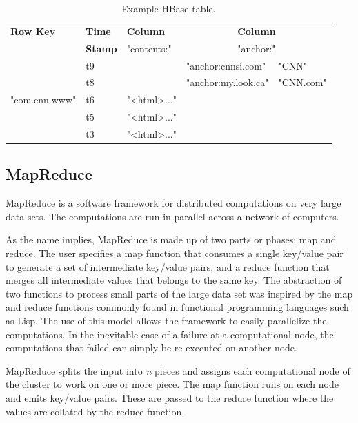 \begin{table}[h]
    \begin{center}
        \begin{tabular}{|l|l|l|l|l|}
        \hline
        \small \bf Row Key & \small \bf Time & \small \bf Column &
        \multicolumn{2}{|c|}{\small \bf Column} \\
         & \small \bf Stamp & \small "contents:" &
        \multicolumn{2}{|c|}{\small "anchor:"} \\
        \hline
         & t9 & & \small "anchor:cnnsi.com" & "CNN" \\
         & t8 & & \small "anchor:my.look.ca" & "CNN.com" \\
        "com.cnn.www" & t6 & \small "{\textless}html\textgreater..." & & \\
         & t5 & \small "{\textless}html\textgreater..." & & \\
         & t3 & \small "{\textless}html\textgreater..." & & \\
        \hline
        \end{tabular}
        \caption{Example HBase table.}
    \end{center}
\end{table}


\subsection{MapReduce}

MapReduce is a software framework for distributed computations on very large
data sets. The computations are run in parallel across a network of computers.

As the name implies, MapReduce is made up of two parts or phases: map and
reduce. The user specifies a map function that consumes a single key/value pair
to generate a set of intermediate key/value pairs, and a reduce function that
merges all intermediate values that belongs to the same key. The abstraction of
two functions to process small parts of the large data set was inspired by the
map and reduce functions commonly found in functional programming languages such
as Lisp. The use of this model allows the framework to easily parallelize the
computations. In the inevitable case of a failure at a computational node, the
computations that failed can simply be re-executed on another node.

MapReduce splits the input into \textit{n} pieces and assigns each computational
node of the cluster to work on one or more piece. The map function runs on each
node and emits key/value pairs. These are passed to the reduce function where
the values are collated by the reduce function.

